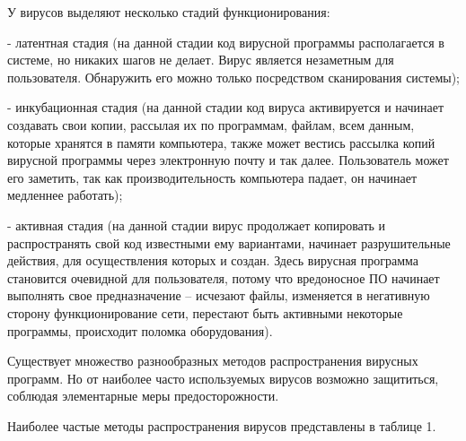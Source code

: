 У вирусов выделяют несколько стадий функционирования: 

- латентная стадия (на данной стадии код вирусной программы располагается в системе, но никаких шагов не делает. Вирус является незаметным для пользователя. Обнаружить его можно только посредством сканирования системы); 

- инкубационная стадия (на данной стадии код вируса активируется и начинает создавать свои копии, рассылая их по программам, файлам, всем данным, которые хранятся в памяти компьютера, также может вестись рассылка копий вирусной программы через электронную почту и так далее. Пользователь может его заметить, так как производительность компьютера падает, он начинает медленнее работать);

- активная стадия (на данной стадии вирус продолжает копировать и распространять свой код известными ему вариантами, начинает разрушительные действия, для осуществления которых и создан. Здесь вирусная программа становится очевидной для пользователя, потому что вредоносное ПО начинает выполнять свое предназначение – исчезают файлы, изменяется в негативную сторону функционирование сети, перестают быть активными некоторые программы, происходит поломка оборудования).

Существует множество разнообразных методов распространения вирусных программ. Но от наиболее часто используемых вирусов возможно защититься, соблюдая элементарные меры предосторожности.

Наиболее частые методы распространения вирусов представлены в таблице 1.


